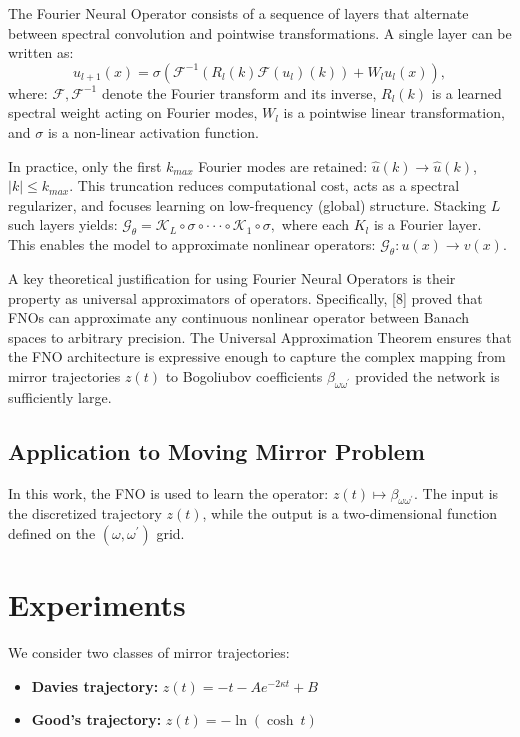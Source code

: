 The Fourier Neural Operator consists of a sequence of layers that alternate between spectral convolution and pointwise transformations. A single layer can be written as: 
\begin{equation}
u_{l+1}(x)=\sigma(\mathcal{F}^{-1}(R_{l}(k)\mathcal{F}(u_{l})(k))+W_{l}u_{l}(x)),
\end{equation}
where: $\mathcal{F}, \mathcal{F}^{-1}$ denote the Fourier transform and its inverse, $R_{l}(k)$ is a learned spectral weight acting on Fourier modes, $W_{l}$ is a pointwise linear transformation, and $\sigma$ is a non-linear activation function. 

In practice, only the first $k_{max}$ Fourier modes are retained: $\hat{u}(k)\rightarrow\hat{u}(k)$, $|k|\le k_{max}$. This truncation reduces computational cost, acts as a spectral regularizer, and focuses learning on low-frequency (global) structure. Stacking $L$ such layers yields: $\mathcal{G}_{\theta}=\mathcal{K}_{L}\circ\sigma\circ\cdot\cdot\cdot\circ\mathcal{K}_{1}\circ\sigma,$ where each $K_{l}$ is a Fourier layer. This enables the model to approximate nonlinear operators: $\mathcal{G}_{\theta}:u(x)\rightarrow v(x)$. 

A key theoretical justification for using Fourier Neural Operators is their property as universal approximators of operators. Specifically, [8] proved that FNOs can approximate any continuous nonlinear operator between Banach spaces to arbitrary precision. The Universal Approximation Theorem ensures that the FNO architecture is expressive enough to capture the complex mapping from mirror trajectories $z(t)$ to Bogoliubov coefficients $\beta_{\omega\omega^{\prime}}$ provided the network is sufficiently large. 

\subsection{Application to Moving Mirror Problem}
In this work, the FNO is used to learn the operator: $z(t)\mapsto\beta_{\omega\omega^{\prime}}$. The input is the discretized trajectory $z(t)$, while the output is a two-dimensional function defined on the $(\omega,\omega^{\prime})$ grid. 

\section{Experiments}
We consider two classes of mirror trajectories: 
\begin{itemize}
    \item \textbf{Davies trajectory:} $z(t)=-t-Ae^{-2\kappa t}+B$
    \item \textbf{Good's trajectory:} $z(t)=-\ln(\cosh~t)$
\end{itemize}

